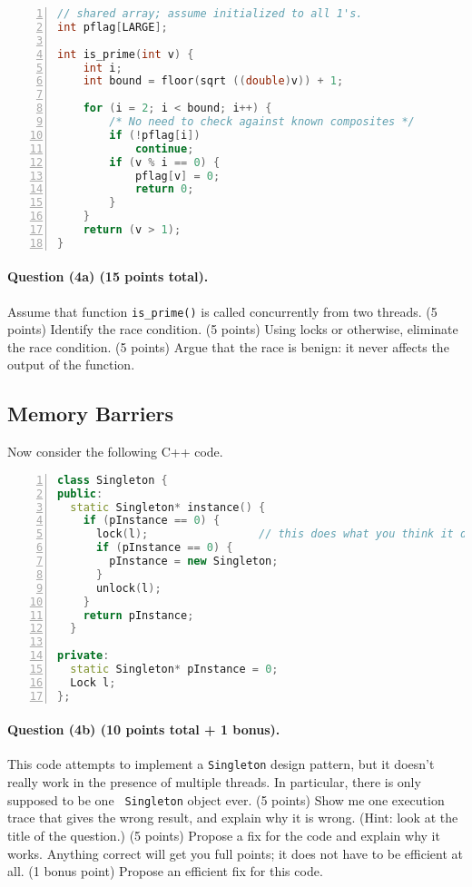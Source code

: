 \documentclass[12pt]{article}
\begin{document}
\begin{lstlisting}[numbers=left,language=C]
// shared array; assume initialized to all 1's.
int pflag[LARGE];

int is_prime(int v) {
    int i;
    int bound = floor(sqrt ((double)v)) + 1;
     
    for (i = 2; i < bound; i++) {
        /* No need to check against known composites */ 
        if (!pflag[i]) 
            continue;
        if (v % i == 0) { 
            pflag[v] = 0;
            return 0;
        }
    }
    return (v > 1); 
}
\end{lstlisting}

\paragraph{Question (4a) (15 points total).} 
Assume that function {\tt is\_prime()} is called concurrently from
two threads. (5 points) Identify the race condition. (5 points) Using locks
or otherwise, eliminate the race condition. (5 points) Argue that the race
is benign: it never affects the output of the function.

\subsection*{Memory Barriers}
Now consider the following C++ code.
\begin{lstlisting}[numbers=left,language=C++]
class Singleton {
public:
  static Singleton* instance() {
    if (pInstance == 0) {
      lock(l);                 // this does what you think it does
      if (pInstance == 0) {
        pInstance = new Singleton;
      }
      unlock(l);
    }
    return pInstance;
  }

private:
  static Singleton* pInstance = 0;
  Lock l;
};
\end{lstlisting}
\paragraph{Question (4b) (10 points total + 1 bonus).} This code attempts to implement a {\tt Singleton}
design pattern, but it doesn't really work in the presence of multiple
threads. In particular, there is only supposed to be one {\tt
  Singleton} object ever.  (5 points) Show me one execution trace that
gives the wrong result, and explain why it is wrong. (Hint: look at the title of the question.) (5 points)
Propose a fix for the code and explain why it works. Anything correct will
get you full points; it does not have to be efficient at all. (1 bonus point)
Propose an efficient fix for this code.
\end{document}
